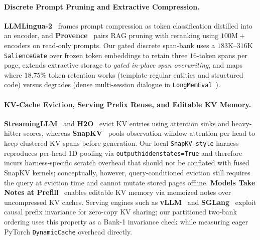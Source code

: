 \documentclass[10pt]{article}
\renewcommand{\_}{\origunderscore\allowbreak}
\begin{document}
\paragraph{Discrete Prompt Pruning and Extractive Compression.}
\textbf{LLMLingua-2}~\citep{pan2024llmlingua2} frames prompt compression as token classification distilled into an encoder, and \textbf{Provence}~\citep{chirkova2025provence} pairs RAG pruning with reranking using $100\text{M}+$ encoders on read-only prompts. Our gated discrete span-bank uses a $183\text{K}$--$316\text{K}$ \texttt{SalienceGate} over frozen token embeddings to retain three $16$-token spans per page, extends extractive storage to \emph{gated in-place span overwriting}, and maps where $18.75\%$ token retention works (template-regular entities and structured code) versus degrades (dense multi-session dialogue in \texttt{LongMemEval}~\citep{wu2025longmemeval}).

\paragraph{KV-Cache Eviction, Serving Prefix Reuse, and Editable KV Memory.}
\textbf{StreamingLLM}~\citep{xiao2024streamingllm} and \textbf{H2O}~\citep{zhang2023h2o} evict KV entries using attention sinks and heavy-hitter scores, whereas \textbf{SnapKV}~\citep{li2024snapkv} pools observation-window attention per head to keep clustered KV spans before generation. Our local \texttt{SnapKV-style} harness reproduces per-head 1D pooling via \texttt{output\_hidden\_states=True} and therefore incurs harness-specific scratch overhead that should not be conflated with fused SnapKV kernels; conceptually, however, query-conditioned eviction still requires the query at eviction time and cannot mutate stored pages offline. \textbf{Models Take Notes at Prefill}~\citep{li2026notes} enables editable KV memory via memoized notes over uncompressed KV caches. Serving engines such as \textbf{vLLM}~\citep{kwon2023vllm} and \textbf{SGLang}~\citep{zheng2024sglang} exploit causal prefix invariance for zero-copy KV sharing; our partitioned two-bank ordering uses this property as a Bank-1 invariance check while measuring eager PyTorch \texttt{DynamicCache} overhead directly.
\end{document}

